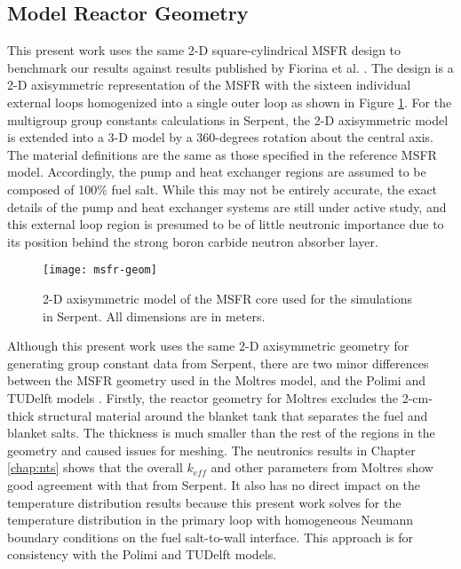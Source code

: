 \subsection{Model Reactor Geometry}

This present work uses the same 2-D square-cylindrical \gls{MSFR} design to
benchmark our results against results published by Fiorina et al.
\cite{fiorina_modelling_2014}. The design is a 2-D axisymmetric representation
of the \gls{MSFR} with the sixteen individual external loops homogenized into
a single outer loop as shown in Figure \ref{fig:msfrgeom}. For the multigroup
group constants calculations in Serpent, the 2-D axisymmetric model is
extended into a 3-D model by a 360-degrees rotation about the
central axis. The material definitions are the same as those specified in the
reference \gls{MSFR} model. Accordingly, the pump and heat exchanger regions
are assumed to be composed of 100\% fuel salt. While this may not be entirely
accurate, the exact details of the pump and heat exchanger systems are still
under active study, and this external loop region is presumed to be of little
neutronic importance due to its position behind the strong boron carbide
neutron absorber layer.
%
\begin{figure}[t!] 
	\centering
	\texttt{[image: msfr-geom]}
	\caption{2-D axisymmetric model of the \gls{MSFR} core used for the
	simulations in Serpent. All dimensions are in meters.
	\cite{brovchenko_neutronic_2019}}
	\label{fig:msfrgeom}
\end{figure}

Although this present work uses the same 2-D axisymmetric geometry for
generating
group constant data from Serpent, there are two minor differences between the
\gls{MSFR} geometry used in the Moltres model, and the Polimi and TUDelft
models \cite{fiorina_modelling_2014}. Firstly, the reactor geometry for
Moltres excludes the 2-cm-thick structural material around the blanket tank
that separates the fuel and blanket salts. The thickness is much smaller than
the rest of the regions in the geometry and caused issues for meshing. The
neutronics results in Chapter \ref{chap:nts} shows that the overall $k_{eff}$
and other parameters from Moltres show good agreement with that from Serpent.
It also has no direct impact on the temperature distribution results because
this present work solves for the temperature distribution in the primary loop
with homogeneous Neumann boundary conditions on the fuel salt-to-wall
interface. This approach is for consistency with the Polimi and TUDelft
models.

